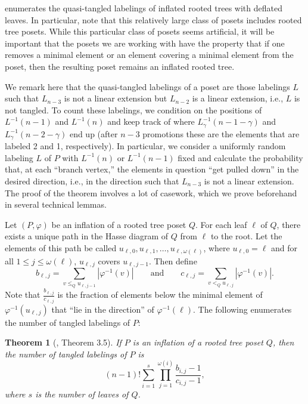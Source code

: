 \documentclass[11pt]{amsart}
\newtheorem{thm}{Theorem}[section]
\theoremstyle{definition}
\newcommand{\inverse}{^{-1}}
\begin{document}
 enumerates the quasi-tangled labelings of inflated rooted trees with deflated leaves. In particular, note that this relatively large class of posets includes rooted tree posets. While this particular class of posets seems artificial, it will be important that the posets we are working with have the property that if one removes a minimal element or an element covering a minimal element from the poset, then the resulting poset remains an inflated rooted tree. 

We remark here that the quasi-tangled labelings of a poset are those labelings $ L $ such that $ L_{n-3} $ is not a linear extension but $ L_{n-2} $ is a linear extension, i.e., $ L $ is not tangled. To count these labelings, we condition on the positions of $ L\inverse(n-1) $ and $ L\inverse(n) $ and keep track of where $ L_{\gamma}\inverse(n-1-\gamma) $ and $ L_\gamma\inverse(n-2-\gamma) $ end up (after $ n-3 $ promotions these are the elements that are labeled 2 and 1, respectively). In particular, we consider a uniformly random labeling $ L $ of $ P $ with $ L\inverse(n) $ or $ L\inverse(n-1) $ fixed and calculate the probability that, at each ``branch vertex,'' the elements in question ``get pulled down'' in the desired direction, i.e., in the direction such that $ L_{n-3} $ is not a linear extension. The proof of the theorem involves a lot of casework, which we prove beforehand in several technical lemmas.

Let $ (P,\varphi) $ be an inflation of a rooted tree poset $ Q $. For each leaf $ \ell $ of $ Q $, there exists a unique path in the Hasse diagram of $ Q $ from $ \ell $ to the root. Let the elements of this path be called $ u_{\ell,0},u_{\ell,1},\ldots,u_{\ell,\omega(\ell)} $, where $ u_{\ell,0}=\ell $ and for all $ 1\leq j\leq\omega(\ell) $, $ u_{\ell,j} $ covers $ u_{\ell,j-1} $. Then define \[b_{\ell,j}=\sum_{v\leq_Q u_{\ell,j-1}}|\varphi\inverse(v)|\qquad\mathrm{and}\qquad c_{\ell,j}=\sum_{v<_Q u_{\ell,j}}|\varphi\inverse(v)|.\] Note that $ \frac{b_{\ell,j}}{c_{\ell,j}} $ is the fraction of elements below the minimal element of $ \varphi\inverse(u_{\ell,j}) $ that ``lie in the direction'' of $ \varphi\inverse(\ell) $. The following enumerates the number of tangled labelings of $ P $:
\begin{thm}[\cite{DK20}, Theorem 3.5]\label{tangled enumeration}
	If $ P $ is an inflation of a rooted tree poset $ Q $, then the number of tangled labelings of $ P $ is \[(n-1)!\sum_{i=1}^{s}\prod_{j=1}^{\omega(i)}\frac{b_{i,j}-1}{c_{i,j}-1},\] where $ s $ is the number of leaves of $ Q $. 
\end{thm}
\end{document}
